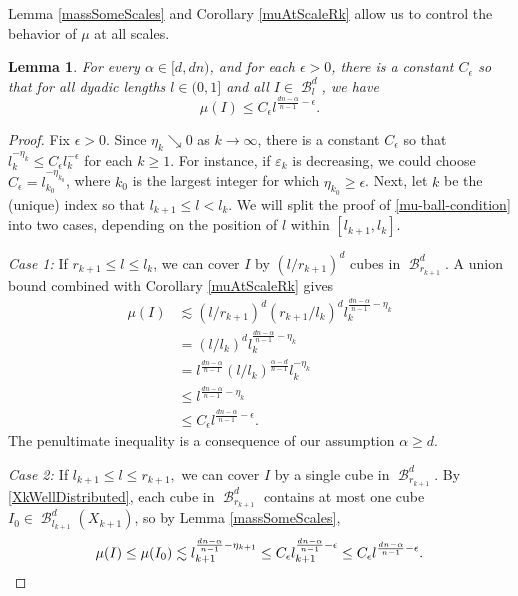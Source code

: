 \documentclass[dvipsnames,letterpaper,12pt]{article}
\numberwithin{equation}{section}
\theoremstyle{plain}
\newtheorem{lemma}{Lemma}
\theoremstyle{remark}
\DeclareMathOperator{\B}{\mathcal{B}}
\begin{document}
Lemma \ref{massSomeScales} and Corollary \ref{muAtScaleRk} allow us to control the behavior of $\mu$ at all scales. 

\begin{lemma} \label{frostmanBound}
	For every $\alpha \in [d, dn)$, and for each $\epsilon>0$, there is a constant $C_\epsilon$ so that for all dyadic lengths $l\in (0,1]$ and all $I \in \B_l^d$, we have
	\begin{equation} 
		\mu(I) \leq C_{\epsilon} l^{\frac{dn - \alpha}{n - 1} - \epsilon}. \label{mu-ball-condition} 
	\end{equation} 
\end{lemma}
\begin{proof}
	Fix $\epsilon > 0$. Since $\eta_k \searrow 0$ as $k\to\infty$, there is a constant $C_{\epsilon}$ so that $l_k^{-\eta_k}\leq C_{\epsilon}l_k^{-\epsilon}$ for each $k \geq 1$. For instance, if $\varepsilon_k$ is decreasing, we could choose $C_{\epsilon}=l_{k_0}^{-\eta_{k_0}}$, where $k_0$ is the largest integer for which $\eta_{k_0} \geq \epsilon$. Next, let $k$ be the (unique) index so that $l_{k+1}\leq l < l_{k}$. We will split the proof of \eqref{mu-ball-condition} into two cases, depending on the position of  $l$ within $[l_{k+1}, l_k]$. 

	\emph{Case 1:} If $r_{k+1} \leq l \leq l_k$, we can cover $I$ by $(l/r_{k+1})^d$ cubes in $\B^d_{r_{k+1}}$. A union bound combined with Corollary \ref{muAtScaleRk} gives
	\begin{equation}
	\begin{split}
	\mu(I) & \lesssim (l/r_{k+1})^d (r_{k+1}/l_k)^d l_k^{\frac{dn-\alpha}{n-1}-\eta_k} \\
	& = (l/l_k)^d l_k^{\frac{dn-\alpha}{n-1}-\eta_{k}}\\
	& = l^{\frac{dn-\alpha}{n-1}} (l/l_k)^{\frac{\alpha - d}{n-1}} l_k^{-\eta_k}\\
	& \leq l^{\frac{dn-\alpha}{n-1} - \eta_k}  \\
	& \leq C_{\epsilon}l^{\frac{dn-\alpha}{n-1}-\epsilon}.
	\end{split}
	\end{equation}
The penultimate inequality is a consequence of our assumption $\alpha \geq d$. 

	{\em{Case 2: }} If $l_{k+1} \leq l \leq r_{k+1},$ we can cover $I$ by a single cube in $\B^d_{r_{k+1}}$. By \eqref{XkWellDistributed}, each cube in $\B^d_{r_{k+1}}$ contains at most one cube $I_0 \in \B^d_{l_{k+1}}(X_{k+1})$, so by Lemma \ref{massSomeScales},
	\[ 
		\mu(I) \leq \mu(I_0) \lesssim l_{k+1}^{\frac{dn - \alpha}{n - 1} - \eta_{k+1}} 
		\leq C_{\epsilon}l_{k+1}^{\frac{dn - \alpha}{n - 1} - \epsilon}
		\leq C_{\epsilon}l^{\frac{dn - \alpha}{n - 1} - \epsilon}.\qedhere
	\]

\end{proof}
\end{document}
